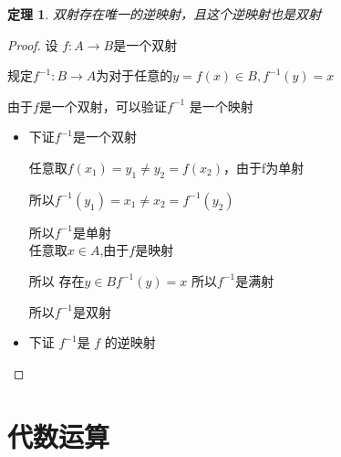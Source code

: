 \documentclass[hyperref,UTF8]{ctexart}
\newtheorem{theorem}{定理}[subsection]
\begin{document}
	
	
	\begin{theorem}
	双射存在唯一的逆映射，且这个逆映射也是双射
	\end{theorem}
	
\begin{proof}
设 $ f:A\to B $是一个双射

规定$ f^{-1}:B\to A  $为对于任意的$ y = f(x)\in B ,f^{-1}(y)=x$

由于$ f $是一个双射，可以验证$ f^{-1} $ 是一个映射

\begin{itemize}
	\item 下证$ f^{-1} $是一个双射
	
	任意取$ f(x_1)=y_1\neq y_2=f(x_2) $，由于f为单射
	
	所以$ f^{-1}(y_1)=x_1 \neq x_2 =f^{-1}(y_2) $
	
	所以$ f^{-1} $是单射
	\\
	
	任意取$ x\in A $,由于$ f $是映射
	
	所以 存在$ y\in B f^{-1}(y)=x $ 
	所以$ f^{-1} $是满射
	
	所以$ f^{-1} $是双射
	
	\item
	下证 $ f^{-1} $是 $ f $ 的逆映射

\end{itemize} 

\end{proof}
	
	
\section{代数运算}
\end{document}
